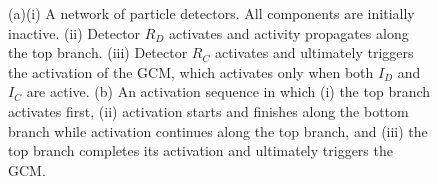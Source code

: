 \documentclass[10pt,letterpaper]{article}
\newcommand{\ev}[2]{$#1_#2$}
\begin{document}
\begin{figure}
\begin{center}
\hfill\null
\end{center}
\vspace{-0.3in}
\caption{(a)(i) A network of particle detectors. All components are initially inactive. (ii) Detector \ev{R}{D} activates and activity propagates along the top branch. (iii) Detector \ev{R}{C} activates and ultimately triggers the activation of the GCM, which activates only when both  \ev{I}{D} and \ev{I}{C} are active. (b) An activation sequence in which (i) the top branch activates first, (ii) activation starts and finishes along the bottom branch while activation continues along the top branch, and (iii) the top branch completes its activation and ultimately triggers the GCM.}
\label{fig:intro}
\end{figure}


\end{document}
